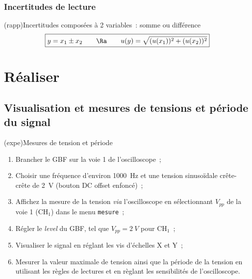 \documentclass[../main/main.tex]{subfiles}
\begin{document}
\subsubsection{Incertitudes de lecture}
\begin{tcb}(rapp){Incertitudes composées à 2 variables~: somme ou différence}
	\[
		\boxed{
			y = x_1 \pm x_2
			\qquad \Ra \qquad
			u(y) = \sqrt{(u(x_1))^{2} + (u(x_2))^{2}}}
	\]
\end{tcb}

\section{Réaliser}
\subsection{Visualisation et mesures de tensions et période du signal}
\begin{tcb}(expe){Mesures de tension et période}
	\begin{enumerate}
		\item Brancher le GBF sur la voie 1 de l'oscilloscope~;
		\item Choisir une fréquence d'environ \SI{1000}{Hz} et une tension
		      sinusoïdale crête-crête de \SI{2}{V} (bouton DC offset enfoncé)~;
		\item Affichez la mesure de la tension \textit{via} l'oscilloscope en
		      sélectionnant $V_{pp}$ de la voie 1 (CH$_1$) dans le menu
		      \texttt{mesure}~;
		\item Régler le \textit{level} du GBF, tel que $V_{pp} = \SI{2}{V}$ pour
		      CH$_1$~;
		\item Visualiser le signal en réglant les vis d'échelles X et Y~;
		\item Mesurer la valeur maximale de tension ainsi que la période de la
		      tension en utilisant les règles de lectures et en règlant les
		      sensibilités de l'oscilloscope.
	\end{enumerate}
\end{tcb}
\end{document}
